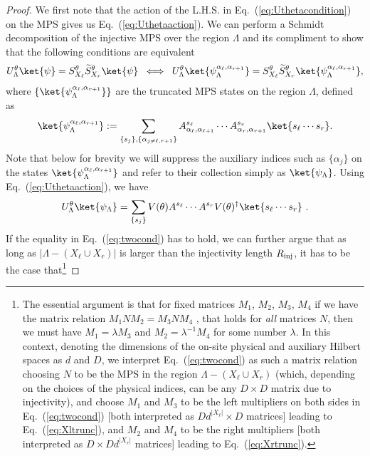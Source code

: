 \documentclass[prx,letterpaper,aps,superscriptaddress,floatfix,twocolumn,nofootinbib]{revtex4-2}
\theoremstyle{definition}
\newcommand{\nn}{\nonumber}
\newcommand{\defn}{:=}
\begin{document}
\begin{proof}
%
We first note that the action of the L.H.S. in Eq.~(\ref{eq:Uthetacondition}) on the MPS gives us Eq.~(\ref{eq:Uthetaaction}).
%
We can perform a Schmidt decomposition of the injective MPS over the region $\Lambda$ and its compliment to show that the following conditions are equivalent
\begin{gather}
    U^\theta_\Lambda \ket{\psi} = S^\theta_{X_\ell} \widetilde{S}^\theta_{X_r}\ket{\psi}\; %
\iff\;U^\theta_\Lambda \ket{\psi^{\alpha_\ell, \alpha_{r+1}}_\Lambda} = S^\theta_{X_\ell} \widetilde{S}^\theta_{X_r}\ket{\psi^{\alpha_\ell, \alpha_{r+1}}_\Lambda},
\label{eq:twocond}
\end{gather}
where $\{\ket{\psi^{\alpha_\ell, \alpha_{r+1}}_{\Lambda}}\}$ are the truncated MPS states on the region $\Lambda$, defined as
\begin{equation}
    \ket{\psi^{\alpha_\ell,\alpha_{r+1}}_{\Lambda}} \defn \sum_{\{s_j\}, \{\alpha_{j \neq \ell, r+1}\}}{A^{s_{\ell}}_{\alpha_\ell,\alpha_{\ell+1}} \cdots A^{s_r}_{\alpha_r, \alpha_{r+1}}}\ket{s_\ell \cdots s_r}.
\label{eq:psitrunc}
\end{equation}
%
Note that below for brevity we will suppress the auxiliary indices such as $\{\alpha_j\}$ on the states $\ket{\psi^{\alpha_\ell,\alpha_{r+1}}_{\Lambda}}$ and refer to their collection simply as $\ket{\psi_{\Lambda}}$.
%
Using Eq.~(\ref{eq:Uthetaaction}), we have
\begin{equation}
    U^\theta_\Lambda \ket{\psi_{\Lambda}} = \sum_{\{s_j\}}{V(\theta) A^{s_{\ell}} \cdots A^{s_r} V(\theta)^\dagger}\ket{s_\ell \cdots s_r} ~.
\label{eq:truncstate}
\end{equation}
%
If the equality in Eq.~(\ref{eq:twocond}) has to hold, we can further argue that as long as $|\Lambda - (X_\ell \cup X_r)|$ is larger than the injectivity length $R_{\rm inj}$, it has to be the case that\footnote{The essential argument is that for fixed matrices $M_1$, $M_2$, $M_3$, $M_4$ if we have the matrix relation $M_1 N M_2 = M_3 N M_4$ , that holds for \textit{all} matrices $N$, then we must have $M_1 = \lambda M_3$ and $M_2 = \lambda^{-1} M_4$ for some number $\lambda$.
%
In this context, denoting the dimensions of the on-site physical and auxiliary Hilbert spaces as $d$ and $D$, we interpret Eq.~(\ref{eq:twocond}) as such a matrix relation choosing $N$ to be the MPS in the region $\Lambda - (X_\ell \cup X_r)$ (which, depending on the choices of the physical indices, can be any $D \times D$ matrix due to injectivity), and choose $M_1$ and $M_3$ to be the left multipliers on both sides in Eq.~(\ref{eq:twocond}) [both interpreted as $D d^{|X_\ell|} \times D$ matrices] leading to Eq.~(\ref{eq:Xltrunc}), and $M_2$ and $M_4$ to be the right multipliers [both interpreted as $D \times D d^{|X_r|}$ matrices] leading to Eq.~(\ref{eq:Xrtrunc}).}

\end{proof}
\end{document}
